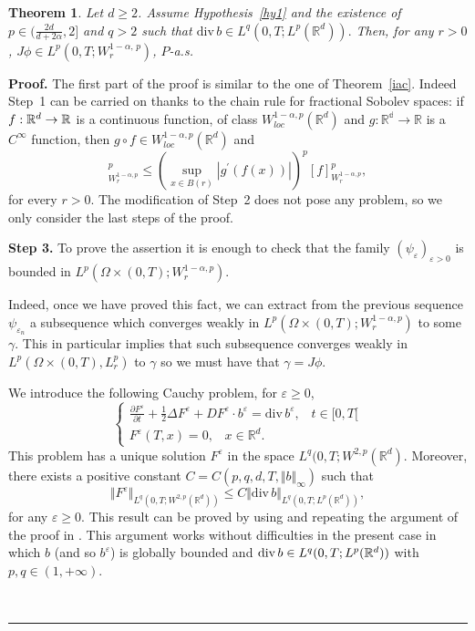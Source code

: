 \documentclass[a4paper,11pt]{article}
\newtheorem{theorem}{Theorem}
\newenvironment{proof}[1][Proof]{\textbf{#1.} }{\ \rule{0.5em}{0.5em}}
\newcommand{\eps}{\varepsilon}
\begin{document}
\begin{theorem}
\label{iac11} Let $d\ge 2$. Assume  Hypothesis~\ref{hy1}  and  the existence of  $p\in (\frac{2d}{ d + 2 \alpha},2]$ and $q>2$ such that
$
 {\mathrm{div}\,}b\in L^{q} (0,T;L^{p}(\mathbb{R}^{d})) .
$
Then,
 for any
 $r>0$,
 $
  J\phi \in
 L^{p}( 0,T;W_{r}^{1 - \alpha, \, p} )$, $P$-a.s.
\end{theorem}
\begin{proof} The first part of the proof is similar to
 the one of Theorem~\ref{iac}. Indeed Step~1 can be carried on thanks to the  chain rule for fractional Sobolev
 spaces:
 if $f:\mathbb{R}^{d}\rightarrow \mathbb{%
R}$ is a continuous function, of class $W_{loc}^{1-\alpha,p}(\mathbb{R}^{d})$ and $%
g:\mathbb{R^d}\rightarrow \mathbb{R}$ is a $C^{\infty }$ function,
then $ g\circ f\in W_{loc}^{1-\alpha,p}(\mathbb{R}^{d})$  and
\begin{equation*}
 [ (g\circ f)]^p_{W_{r}^{1- \alpha, p}}
 \leq \left( \sup_{x\in B(r)}\left|
g^{\prime }(f(x))\right| \right) ^{p} [  f]^p_{W_{r}^{1- \alpha,
p}},
\end{equation*}
for every $r>0$. The modification of Step~2 does not pose any problem, so we only consider the last steps of the proof.

\medskip \textbf{Step 3.} To prove the assertion it is enough
 to check that the family $\left(
\psi _{\varepsilon }\right) _{\varepsilon >0}$ is bounded in
 $L^{p}(\Omega \times (0,T);W_{r}^{1-\alpha,p})$.

Indeed, once we have proved this fact, we can extract from
 the previous
sequence
 $\psi _{\varepsilon _{n}}$ a subsequence which converges
  weakly in $L^{p}(\Omega
\times (0,T);W_{r}^{1-\alpha,p})$ to some $\gamma $. This in
particular implies that such subsequence  converges weakly in
$L^{p}(\Omega \times (0,T),L_{r}^{p})$ to  $\gamma $ so we must have that $\gamma = J \phi$.

We introduce the following Cauchy problem, for $\eps \ge 0$,
\begin{equation}
\left\{ \begin{aligned} \frac{\partial F^{\eps}}{\partial t}+
\frac{1}{2} \Delta F^{\eps} + D F^{\eps} \cdot b^{\eps}
={\mathrm{div}\, }b^{\eps}, \;\;
\; t \in [0,T[ \\ F^{\eps}(T,x)=0,\;\;\; x \in \mathbb{R} ^d. \end{aligned}%
\right.   \label{equa1}
\end{equation}
  This  problem
 has a unique solution $F^{\eps}$ in the space
 $L^{q}(0,T;W^{2,p}(\mathbb{ R}^{d})$. Moreover,
there exists a positive constant $C=C(p,q,
 d,T,\Vert b\Vert _{\infty
})$ such that
\begin{equation}
\Vert F^{\eps}\Vert _{L^{q}(0,T;W^{2,p}(\mathbb{ R}^{d})) }\leq
C\Vert
 \mathrm{div \,}b \Vert _{L^{q}(0,T;L^{p}(\mathbb{
R}^{d}))},  \label{bond5}
\end{equation}
for any $\eps \ge 0$.  This result  can be proved by using
\cite[Theorem 1.2]{Kr1}  and repeating the
 argument  of the proof
 in \cite[Theorem 10.3]{Kry-Ro}. This argument  works without
difficulties in the present case in which $b$ (and so $b^{\eps}$)
is globally bounded and $\mathrm{div \,}b \in
L^{q}(0,T;L^{p}(\mathbb{%
R}^{d}))$ with  $p, q \in (1, + \infty)$.


\end{proof}
\end{document}
